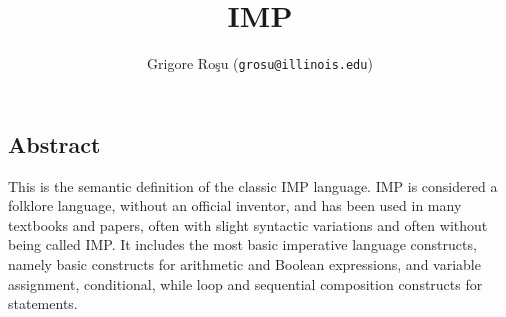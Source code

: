 
\setlength{\parindent}{1em}
\title{IMP}
\author{Grigore Ro\c{s}u (\texttt{grosu@illinois.edu})}

\maketitle

\begin{latexComment}
\section{Abstract}
This is the \K semantic definition of the classic IMP language.
IMP is considered a folklore language, without an official inventor,
and has been used in many textbooks and papers, often with slight
syntactic variations and often without being called IMP.  It includes
the most basic imperative language constructs, namely basic constructs
for arithmetic and Boolean expressions, and variable assignment,
conditional, while loop and sequential composition constructs for statements.
\end{latexComment}

\vspace*{3ex}
